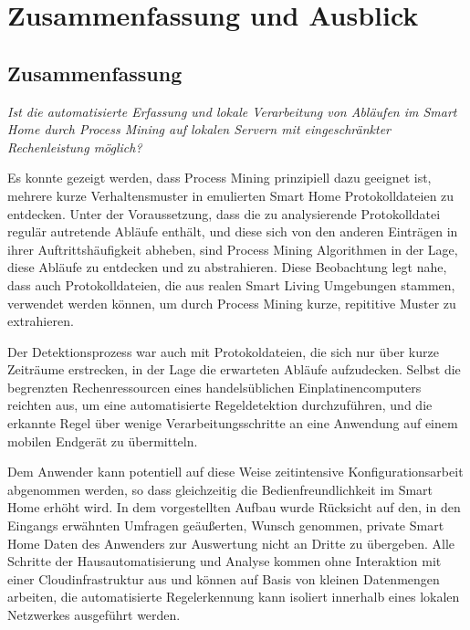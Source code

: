 \chapter{Zusammenfassung und Ausblick}
\section{Zusammenfassung}
\vspace{5mm}
\textsl{Ist die automatisierte Erfassung und lokale Verarbeitung von Abläufen im Smart Home durch Process Mining auf lokalen Servern mit eingeschränkter Rechenleistung möglich?}
\vspace{5mm}

Es konnte gezeigt werden, dass Process Mining prinzipiell dazu geeignet ist, mehrere kurze Verhaltensmuster in emulierten Smart Home Protokolldateien zu entdecken. Unter der Voraussetzung, dass die zu analysierende Protokolldatei regulär autretende Abläufe enthält, und diese sich von den anderen Einträgen in ihrer Auftrittshäufigkeit abheben, sind Process Mining Algorithmen in der Lage, diese Abläufe zu entdecken und zu abstrahieren. Diese Beobachtung legt nahe, dass auch Protokolldateien, die aus realen Smart Living Umgebungen stammen, verwendet werden können, um durch Process Mining kurze, repititive Muster zu extrahieren. 

Der Detektionsprozess war auch mit Protokoldateien, die sich nur über kurze Zeiträume erstrecken, in der Lage die erwarteten Abläufe aufzudecken. Selbst die begrenzten Rechenressourcen eines handelsüblichen Einplatinencomputers reichten aus, um eine automatisierte Regeldetektion durchzuführen, und die erkannte Regel über wenige Verarbeitungsschritte an eine Anwendung auf einem mobilen Endgerät zu übermitteln.

Dem Anwender kann potentiell auf diese Weise zeitintensive Konfigurationsarbeit abgenommen werden, so dass gleichzeitig die Bedienfreundlichkeit im Smart Home erhöht wird. In dem vorgestellten Aufbau wurde Rücksicht auf den, in den Eingangs erwähnten Umfragen geäußerten, Wunsch genommen, private Smart Home Daten des Anwenders zur Auswertung nicht an Dritte zu übergeben. Alle Schritte der Hausautomatisierung und Analyse kommen ohne Interaktion mit einer Cloudinfrastruktur aus und können auf Basis von kleinen Datenmengen arbeiten, die automatisierte Regelerkennung kann isoliert innerhalb eines lokalen Netzwerkes ausgeführt werden.

